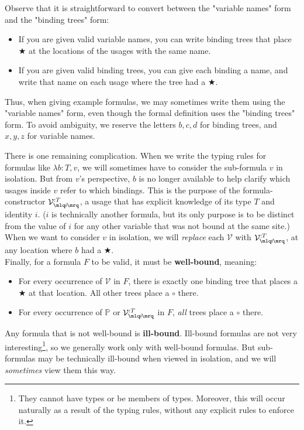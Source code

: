 \documentclass{article}
\newcommand{\Prop}{\mathbb{P}}
\newcommand{\usage}{\mathcal{V}}
\newcommand{\usageKnown}[2]{{\usage_{\mlq\hspace{-0.06em}#2\hspace{-0.06em}\mrq}^{:#1}}}
\newcommand{\bindvariable}{\bigstar}
\newcommand{\bindnotthis}{\circ}
\begin{document}
  Observe that it is straightforward to convert between the "variable names" form and the "binding trees" form:
  \begin{itemize}
    \item If you are given valid variable names, you can write binding trees that place $\bindvariable$ at the locations of the usages with the same name.
    \item If you are given valid binding trees, you can give each binding a name, and write that name on each usage where the tree had a $\bindvariable$.
  \end{itemize}
  
  Thus, when giving example formulas, we may sometimes write them using the "variable names" form, even though the formal definition uses the "binding trees" form. To avoid ambiguity, we reserve the letters $b,c,d$ for binding trees, and $x,y,z$ for variable names.
  
  There is one remaining complication. When we write the typing rules for formulas like $\lambda b:T,v$, we will sometimes have to consider the sub-formula $v$ in isolation. But from $v$'s perspective, $b$ is no longer available to help clarify which usages inside $v$ refer to which bindings. This is the purpose of the formula-constructor $\usageKnown{T}{i}$, a usage that has explicit knowledge of its type $T$ and identity $i$. ($i$ is technically another formula, but its only purpose is to be distinct from the value of $i$ for any other variable that was not bound at the same site.) When we want to consider $v$ in isolation, we will \emph{replace} each $\usage$ with $\usageKnown{T}{i}$, at any location where $b$ had a $\bindvariable$.\\
  
  Finally, for a formula $F$ to be valid, it must be \textbf{well-bound}, meaning:
  \begin{itemize}
    \item For every occurrence of $\usage$ in $F$, there is exactly one binding tree that places a $\bindvariable$ at that location. All other trees place a $\bindnotthis$ there.
    \item For every occurrence of $\Prop$ or $\usageKnown{T}{i}$ in $F$, \emph{all} trees place a $\bindnotthis$ there.
  \end{itemize}
  
  Any formula that is not well-bound is \textbf{ill-bound}. Ill-bound formulas are not very interesting\footnote{They cannot have types or be members of types. Moreover, this will occur naturally as a result of the typing rules, without any explicit rules to enforce it.}, so we generally work only with well-bound formulas. But sub-formulas may be technically ill-bound when viewed in isolation, and we will \emph{sometimes} view them this way.
  
\end{document}
